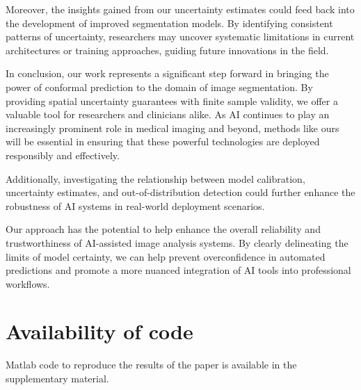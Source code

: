 Moreover, the insights gained from our uncertainty estimates could feed back into the development of improved segmentation models. By identifying consistent patterns of uncertainty, researchers may uncover systematic limitations in current architectures or training approaches, guiding future innovations in the field.

In conclusion, our work represents a significant step forward in bringing the power of conformal prediction to the domain of image segmentation. By providing spatial uncertainty guarantees with finite sample validity, we offer a valuable tool for researchers and clinicians alike. As AI continues to play an increasingly prominent role in medical imaging and beyond, methods like ours will be essential in ensuring that these powerful technologies are deployed responsibly and effectively.

Additionally, investigating the relationship between model calibration, uncertainty estimates, and out-of-distribution detection could further enhance the robustness of AI systems in real-world deployment scenarios.

Our approach has the potential to help enhance the overall reliability and trustworthiness of AI-assisted image analysis systems. By clearly delineating the limits of model certainty, we can help prevent overconfidence in automated predictions and promote a more nuanced integration of AI tools into professional workflows.

\section*{Availability of code}
\vspace{-0.1cm}
Matlab code to reproduce the results of the paper is available in the supplementary material.